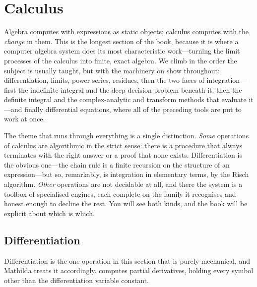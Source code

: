 \section{Calculus}
\label{sec:calculus}

Algebra computes with expressions as static objects; calculus computes with the
\emph{change} in them. This is the longest section of the book, because it is
where a computer algebra system does its most characteristic work---turning the
limit processes of the calculus into finite, exact algebra. We climb in the
order the subject is usually taught, but with the machinery on show throughout:
differentiation, limits, power series, residues, then the two faces of
integration---first the indefinite integral and the deep decision problem
beneath it, then the definite integral and the complex-analytic and
transform methods that evaluate it---and finally differential equations, where
all of the preceding tools are put to work at once.

The theme that runs through everything is a single distinction. \emph{Some}
operations of calculus are algorithmic in the strict sense: there is a procedure
that always terminates with the right answer or a proof that none exists.
Differentiation is the obvious one---the chain rule is a finite recursion on the
structure of an expression---but so, remarkably, is integration in elementary
terms, by the Risch algorithm. \emph{Other} operations are not decidable at all,
and there the system is a toolbox of specialised engines, each complete on the
family it recognises and honest enough to decline the rest. You will see both
kinds, and the book will be explicit about which is which.

\subsection{Differentiation}
\label{ssec:calc-deriv}

Differentiation is the one operation in this section that
is purely mechanical, and Mathilda treats it accordingly.  computes partial
derivatives, holding every symbol other than the differentiation variable
constant.

\begin{codepairs}
\end{codepairs}

